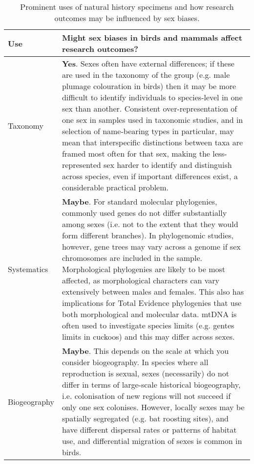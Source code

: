 
\begin{longtable}{p{3cm} p{16cm}}

\caption{Prominent uses of natural history specimens and how research outcomes may be influenced by sex biases.}\\ 
  
  \hline
  \textbf{Use} & \textbf{Might sex biases in birds and mammals affect research outcomes?}\\ 

  \hline
  Taxonomy & \textbf{Yes}. Sexes often have external differences; if these are used in the taxonomy of the group (e.g. male plumage colouration in birds\cite{paxton2009utility}) then it may be more difficult to identify individuals to species-level in one sex than another. Consistent over-representation of one sex in samples used in taxonomic studies, and in selection of name-bearing types in particular, may mean that interspecific distinctions between taxa are framed most often for that sex, making the less-represented sex harder to identify and distinguish across species, even if important differences exist, a considerable practical problem. \\ 

  Systematics & \textbf{Maybe}. For standard molecular phylogenies, commonly used genes do not differ substantially among sexes (i.e. not to the extent that they would form different branches). In phylogenomic studies, however, gene trees may vary across a genome if sex chromosomes are included in the sample\cite{reddy2017}. Morphological phylogenies are likely to be most affected, as morphological characters can vary extensively between males and females. This also has implications for Total Evidence phylogenies that use both morphological and molecular data. mtDNA is often used to investigate species limits (e.g. gentes limits in cuckoos\cite{soler2009geographic}) and this may differ across sexes.\\ 

  Biogeography & \textbf{Maybe}. This depends on the scale at which you consider biogeography. In species where all reproduction is sexual, sexes (necessarily) do not differ in terms of large-scale historical biogeography, i.e. colonisation of new regions will not succeed if only one sex colonises. However, locally sexes may be spatially segregated (e.g. bat roosting sites\cite{altringham}), and have different dispersal rates\cite{pusey1987sex} or patterns of habitat use, and differential migration of sexes is common in birds\cite{Woodworth2016}.\\ 


\end{longtable}
